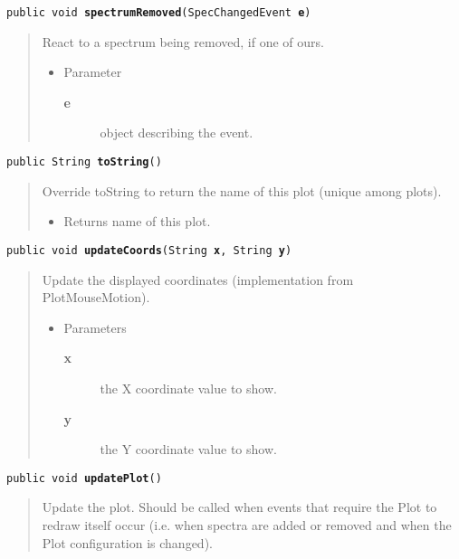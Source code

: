 \documentclass[twoside,11pt,nolof]{starlink}
\providecommand{\method}[1]{\texttt{#1}}
\newenvironment{desc}{\begin{quote}}{\end{quote}}
\begin{document}
\method{public void \textbf{spectrumRemoved}(\texttt{SpecChangedEvent} \textbf{e})\label{l222}\label{l223}}
\begin{desc}React to a spectrum being removed, if one of ours.
\begin{itemize}
\item{Parameter
  \begin{description}
   \item[\textbf{e}]{object describing the event.}
  \end{description}}
\end{itemize}
\end{desc}

\method{public String \textbf{toString}()\label{l224}\label{l225}}
\begin{desc}Override toString to return the name of this plot (unique
 among plots).
\begin{itemize}
\item{Returns name of this plot. }
\end{itemize}
\end{desc}

\method{public void \textbf{updateCoords}(\texttt{String} \textbf{x}, \texttt{String} \textbf{y})\label{l226}\label{l227}}
\begin{desc}Update the displayed coordinates (implementation from PlotMouseMotion).
\begin{itemize}
\item{Parameters
  \begin{description}
   \item[\textbf{x}]{the X coordinate value to show.}
   \item[\textbf{y}]{the Y coordinate value to show.}
  \end{description}}
\end{itemize}
\end{desc}

\method{public void \textbf{updatePlot}()\label{l228}\label{l229}}
\begin{desc}Update the plot. Should be called when events that require the
 Plot to redraw itself occur (i.e. when spectra are added or
 removed and when the Plot configuration is changed).
\end{desc}
\end{document}

